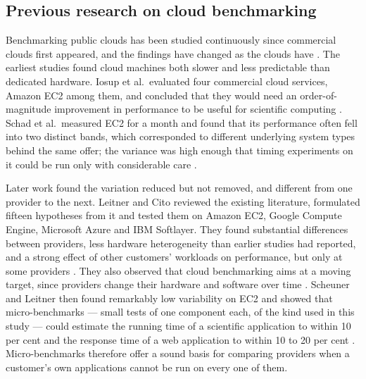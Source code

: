 \subsection{Previous research on cloud benchmarking}

Benchmarking public clouds has been studied continuously since commercial
clouds first appeared, and the findings have changed as the clouds have
\cite{LeitnerCito_Chaos_2016}. The earliest studies found cloud machines both
slower and less predictable than dedicated hardware. Iosup et al.\ evaluated four
commercial cloud services, Amazon EC2 among them, and concluded that they would
need an order-of-magnitude improvement in performance to be useful for
scientific computing \cite{Iosup_ManyTasks_2011}. Schad et al.\ measured EC2 for
a month and found that its performance often fell into two distinct bands, which
corresponded to different underlying system types behind the same offer; the
variance was high enough that timing experiments on it could be run only with
considerable care \cite{Schad_Runtime_2010}.

Later work found the variation reduced but not removed, and different from one
provider to the next. Leitner and Cito reviewed the existing literature,
formulated fifteen hypotheses from it and tested them on Amazon EC2, Google
Compute Engine, Microsoft Azure and IBM Softlayer. They found substantial
differences between providers, less hardware heterogeneity than earlier studies
had reported, and a strong effect of other customers' workloads on performance,
but only at some providers \cite{LeitnerCito_Chaos_2016}. They also observed that
cloud benchmarking aims at a moving target, since providers change their
hardware and software over time \cite{LeitnerCito_Chaos_2016}. Scheuner and
Leitner then found remarkably low variability on EC2 and showed that
micro-benchmarks --- small tests of one component each, of the kind used in this
study --- could estimate the running time of a scientific application to within
10 per cent and the response time of a web application to within 10 to 20 per
cent \cite{ScheunerLeitner_MicroBench_2018}. Micro-benchmarks therefore offer a
sound basis for comparing providers when a customer's own applications cannot be
run on every one of them.

